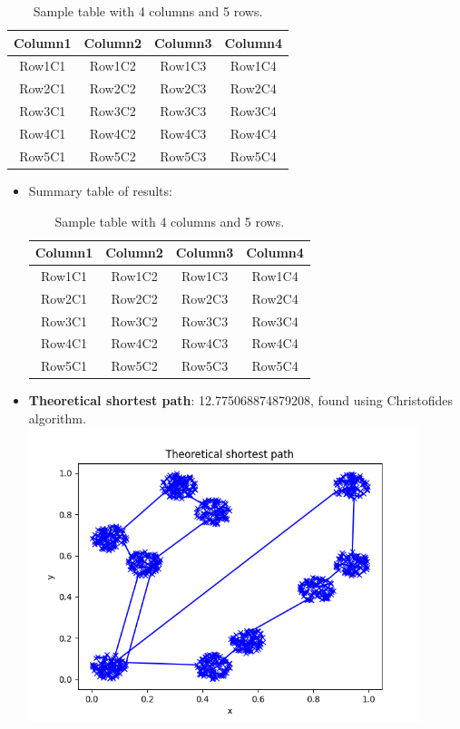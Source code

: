 \documentclass[twoside,11pt]{homework}
\begin{document}
\begin{table}
    \centering
    \begin{tabular}{|c|c|c|c|}
    \hline
    Column1 & Column2 & Column3 & Column4 \\
    \hline
    Row1C1 & Row1C2 & Row1C3 & Row1C4 \\
    \hline
    Row2C1 & Row2C2 & Row2C3 & Row2C4 \\
    \hline
    Row3C1 & Row3C2 & Row3C3 & Row3C4 \\
    \hline
    Row4C1 & Row4C2 & Row4C3 & Row4C4 \\
    \hline
    Row5C1 & Row5C2 & Row5C3 & Row5C4 \\
    \hline
    \end{tabular}
    \caption{Sample table with 4 columns and 5 rows.}
    \end{table}
\begin{itemize}
    \item Summary table of results:
    \begin{table}
        \centering
        \begin{tabular}{|c|c|c|c|}
        \hline
        Column1 & Column2 & Column3 & Column4 \\
        \hline
        Row1C1 & Row1C2 & Row1C3 & Row1C4 \\
        \hline
        Row2C1 & Row2C2 & Row2C3 & Row2C4 \\
        \hline
        Row3C1 & Row3C2 & Row3C3 & Row3C4 \\
        \hline
        Row4C1 & Row4C2 & Row4C3 & Row4C4 \\
        \hline
        Row5C1 & Row5C2 & Row5C3 & Row5C4 \\
        \hline
        \end{tabular}
        \caption{Sample table with 4 columns and 5 rows.}
        \end{table}
    \item \textbf{Theoretical shortest path}: 12.775068874879208, found using Christofides algorithm.
    \includegraphics[width=0.9\textwidth]{theoretical_shortest.png}
\end{itemize}
\end{document}
